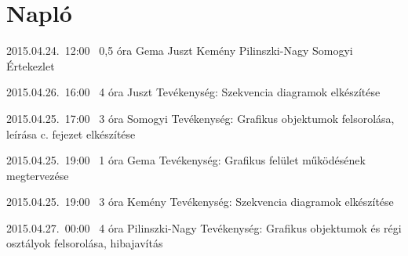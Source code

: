 %
\section{Napló}

\begin{naplo}

\bejegyzes
{2015.04.24.~12:00~} %
{0,5 óra} %
{Gema\newline
Juszt\newline
Kemény\newline
Pilinszki-Nagy\newline
Somogyi} %
{Értekezlet} %

\bejegyzes
{2015.04.26.~16:00~}
{4 óra}
{Juszt}
{Tevékenység: Szekvencia diagramok elkészítése}

\bejegyzes
{2015.04.25.~17:00~}
{3 óra}
{Somogyi}
{Tevékenység: Grafikus objektumok felsorolása, leírása c. fejezet elkészítése}

\bejegyzes
{2015.04.25.~19:00~}
{1 óra}
{Gema}
{Tevékenység: Grafikus felület működésének megtervezése}

\bejegyzes
{2015.04.25.~19:00~}
{3 óra}
{Kemény}
{Tevékenység: Szekvencia diagramok elkészítése}

\bejegyzes
{2015.04.27.~00:00~}
{4 óra}
{Pilinszki-Nagy}
{Tevékenység: Grafikus objektumok és régi osztályok felsorolása, hibajavítás}

\end{naplo}


